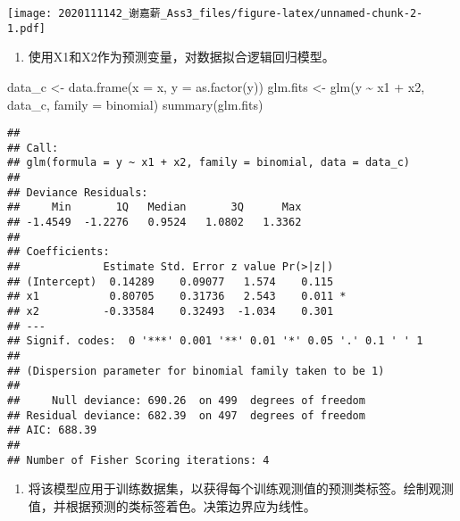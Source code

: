 \documentclass[
]{article}
\newenvironment{Shaded}{\begin{snugshade}}{\end{snugshade}}
\newcommand{\AttributeTok}[1]{\textcolor[rgb]{0.77,0.63,0.00}{#1}}
\newcommand{\FunctionTok}[1]{\textcolor[rgb]{0.00,0.00,0.00}{#1}}
\newcommand{\NormalTok}[1]{#1}
\newcommand{\OtherTok}[1]{\textcolor[rgb]{0.56,0.35,0.01}{#1}}
\newcommand{\SpecialCharTok}[1]{\textcolor[rgb]{0.00,0.00,0.00}{#1}}
\providecommand{\tightlist}{%
  \setlength{\itemsep}{0pt}\setlength{\parskip}{0pt}}
\begin{document}
\texttt{[image: 2020111142\_谢嘉薪\_Ass3\_files/figure-latex/unnamed-chunk-2-1.pdf]}

\begin{enumerate}
\def\labelenumi{(\alph{enumi})}
\setcounter{enumi}{2}
\tightlist
\item
  使用X1和X2作为预测变量，对数据拟合逻辑回归模型。
\end{enumerate}

\begin{Shaded}
\begin{Highlighting}[]
\NormalTok{data\_c }\OtherTok{\textless{}{-}} \FunctionTok{data.frame}\NormalTok{(}\AttributeTok{x =}\NormalTok{ x, }\AttributeTok{y =} \FunctionTok{as.factor}\NormalTok{(y))}
\NormalTok{glm.fits }\OtherTok{\textless{}{-}} \FunctionTok{glm}\NormalTok{(y }\SpecialCharTok{\textasciitilde{}}\NormalTok{ x1 }\SpecialCharTok{+}\NormalTok{ x2, data\_c, }\AttributeTok{family =}\NormalTok{ binomial)}
\FunctionTok{summary}\NormalTok{(glm.fits)}
\end{Highlighting}
\end{Shaded}

\begin{verbatim}
## 
## Call:
## glm(formula = y ~ x1 + x2, family = binomial, data = data_c)
## 
## Deviance Residuals: 
##     Min       1Q   Median       3Q      Max  
## -1.4549  -1.2276   0.9524   1.0802   1.3362  
## 
## Coefficients:
##             Estimate Std. Error z value Pr(>|z|)  
## (Intercept)  0.14289    0.09077   1.574    0.115  
## x1           0.80705    0.31736   2.543    0.011 *
## x2          -0.33584    0.32493  -1.034    0.301  
## ---
## Signif. codes:  0 '***' 0.001 '**' 0.01 '*' 0.05 '.' 0.1 ' ' 1
## 
## (Dispersion parameter for binomial family taken to be 1)
## 
##     Null deviance: 690.26  on 499  degrees of freedom
## Residual deviance: 682.39  on 497  degrees of freedom
## AIC: 688.39
## 
## Number of Fisher Scoring iterations: 4
\end{verbatim}

\begin{enumerate}
\def\labelenumi{(\alph{enumi})}
\setcounter{enumi}{3}
\tightlist
\item
  将该模型应用于训练数据集，以获得每个训练观测值的预测类标签。绘制观测值，并根据预测的类标签着色。决策边界应为线性。
\end{enumerate}
\end{document}
